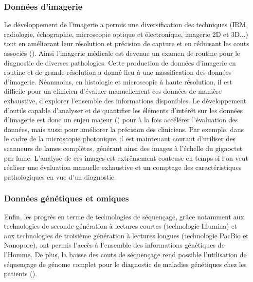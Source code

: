 \subsubsection{Données d'imagerie}
Le développement de l'imagerie a permis une diversification des techniques (IRM, radiologie, échographie, microscopie optique et électronique, imagerie 2D et 3D...) tout en améliorant leur résolution et précision de capture et en réduisant les couts associés (\cite{abdallah_history_2017, prakash_super-resolution_2022, sheppard_structured_2021}). Ainsi l'imagerie médicale est devenue un examen de routine pour le diagnostic de diverses pathologies. Cette production de données d'imagerie en routine et de grande résolution a donné lieu à une massification des données d'imagerie. Néanmoins, en histologie et microscopie à haute résolution, il est difficile pour un clinicien d'évaluer manuellement ces données de manière exhaustive, d'explorer l'ensemble des informations disponibles. Le développement d'outils capable d'analyser et de quantifier les éléments d'intérêt sur les données d'imagerie est donc un enjeu majeur (\cite{tchito_tchapga_biomedical_2021}) pour à la fois accélérer l'évaluation des données, mais aussi pour améliorer la précision des cliniciens. Par exemple, dans le cadre de la microscopie photonique, il est maintenant courant d'utiliser des scanneurs de lames complètes, générant ainsi des images à l'échelle du gigaoctet par lame. L'analyse de ces images est extrêmement couteuse en temps si l’on veut réaliser une évaluation manuelle exhaustive et un comptage des caractéristiques pathologiques en vue d'un diagnostic.

\subsubsection{Données génétiques et omiques}
Enfin, les progrès en terme de technologies de séquençage, grâce notamment aux technologies de seconde génération à lectures courtes (technologie Illumina) et aux technologies de troisième génération à lectures longues (technologie PacBio et Nanopore), ont permis l'accès à l'ensemble des informations génétiques de l'Homme. De plus, la baisse des couts de séquençage rend possible l'utilisation de séquençage de génome complet pour le diagnostic de maladies génétiques chez les patients (\cite{rabbani_next-generation_2012}). 

